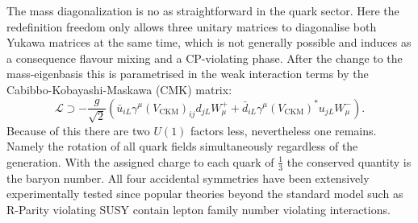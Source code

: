 The mass diagonalization is no as straightforward in the quark sector. Here the redefinition freedom only allows three unitary matrices to diagonalise both Yukawa matrices at the same time, which is not generally possible and induces as a consequence flavour mixing and a CP-violating phase. After the change to the mass-eigenbasis this is parametrised  in the weak interaction terms by the Cabibbo-Kobayashi-Maskawa (CMK) matrix:
\begin{equation}
\mathcal{L}\supset -\frac{g}{\sqrt{2}}\left(\bar{u}_{iL}\gamma^\mu \left(V_\text{CKM}\right)_{ij}d_{jL}W_\mu^++\bar{d}_{iL}\gamma^\mu\left(V_\text{CKM}\right)^*u_{jL}W_\mu^-\right).
\end{equation}
Because of this there are two $U(1)$ factors less, nevertheless one remains. Namely the rotation of all quark fields simultaneously regardless of the generation. With the assigned charge to each quark of $\frac{1}{3}$ the conserved quantity is the baryon number.
All four accidental symmetries have been extensively experimentally tested since popular theories beyond the standard model such as R-Parity violating SUSY contain lepton family number violating interactions.

